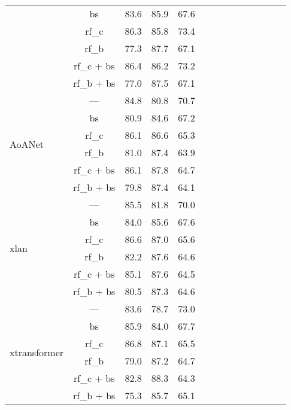 \documentclass[journal,comsoc]{IEEEtran}
\begin{document}
\begin{table*}[htp]
\begin{tabular}{l|c|cccccccccccc}
                                          & bs    &  83.6   &  85.9 & 67.6 \\
                                          & rf\_c     &   86.3   &   85.8 & 73.4 \\
                                          & rf\_b  &  77.3   &   87.7 & 67.1\\
                                          & rf\_c + bs     &   86.4   &   86.2 &73.2 \\
                                          & rf\_b + bs   &  77.0   &   87.5 &  67.1 \\ \hline
\multirow{6}{*}{AoANet \cite{huang2019attention}}           & ---  & 84.8   &   80.8  & 70.7\\
                                          & bs    &  80.9   &   84.6 & 67.2 \\
                                          & rf\_c  &  86.1   &   86.6 & 65.3 \\
                                          & rf\_b   &  81.0   &   87.4  & 63.9\\
                                          & rf\_c + bs   &   86.1   &   87.8 & 64.7 \\
                                          & rf\_b + bs  &  79.8   &  87.4  & 64.1 \\ \hline
\multirow{6}{*}{xlan \cite{pan2020x}}     & ---   & 85.5   &   81.8 & 70.0\\
                                          & bs    & 84.0   &   85.6 & 67.6\\
                                          & rf\_c   & 86.6   &   87.0 & 65.6\\
                                          & rf\_b   & 82.2   &   87.6 & 64.6 \\
                                          & rf\_c + bs  &  85.1   &   87.6 & 64.5\\
                                          & rf\_b + bs  &  80.5   &   87.3 &  64.6\\ \hline
\multirow{6}{*}{xtransformer \cite{pan2020x}}   & ---   & 83.6   &   78.7 & 73.0\\
                                          & bs    & 85.9   &   84.0 &67.7 \\
                                          & rf\_c   & 86.8   &   87.1 &65.5 \\
                                          & rf\_b   &  79.0   &   87.2  & 64.7 \\
                                          & rf\_c + bs  & 82.8   &   88.3  & 64.3\\
                                          & rf\_b + bs  &  75.3   &   85.7 & 65.1\\ \hline
\end{tabular}
\end{table*}
\end{document}
